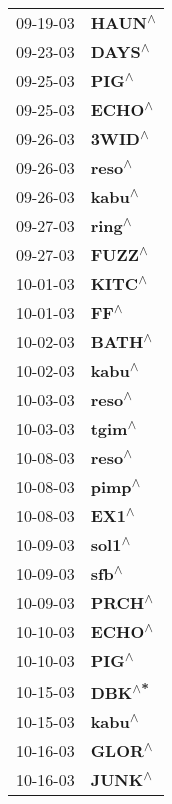 \begin{supertabular}{p{0.08\textwidth}p{0.2\textwidth}}
 09-19-03 &    \textbf{HAUN\textsuperscript{$\wedge$}} \\
 09-23-03 &    \textbf{DAYS\textsuperscript{$\wedge$}} \\
 09-25-03 &     \textbf{PIG\textsuperscript{$\wedge$}} \\
 09-25-03 &    \textbf{ECHO\textsuperscript{$\wedge$}} \\
 09-26-03 &    \textbf{3WID\textsuperscript{$\wedge$}} \\
 09-26-03 &    \textbf{reso\textsuperscript{$\wedge$}} \\
 09-26-03 &    \textbf{kabu\textsuperscript{$\wedge$}} \\
 09-27-03 &    \textbf{ring\textsuperscript{$\wedge$}} \\
 09-27-03 &    \textbf{FUZZ\textsuperscript{$\wedge$}} \\
 10-01-03 &    \textbf{KITC\textsuperscript{$\wedge$}} \\
 10-01-03 &      \textbf{FF\textsuperscript{$\wedge$}} \\
 10-02-03 &    \textbf{BATH\textsuperscript{$\wedge$}} \\
 10-02-03 &    \textbf{kabu\textsuperscript{$\wedge$}} \\
 10-03-03 &    \textbf{reso\textsuperscript{$\wedge$}} \\
 10-03-03 &    \textbf{tgim\textsuperscript{$\wedge$}} \\
 10-08-03 &    \textbf{reso\textsuperscript{$\wedge$}} \\
 10-08-03 &    \textbf{pimp\textsuperscript{$\wedge$}} \\
 10-08-03 &     \textbf{EX1\textsuperscript{$\wedge$}} \\
 10-09-03 &    \textbf{sol1\textsuperscript{$\wedge$}} \\
 10-09-03 &     \textbf{sfb\textsuperscript{$\wedge$}} \\
 10-09-03 &    \textbf{PRCH\textsuperscript{$\wedge$}} \\
 10-10-03 &    \textbf{ECHO\textsuperscript{$\wedge$}} \\
 10-10-03 &     \textbf{PIG\textsuperscript{$\wedge$}} \\
 10-15-03 &    \textbf{DBK\textsuperscript{$\wedge$*}} \\
 10-15-03 &    \textbf{kabu\textsuperscript{$\wedge$}} \\
 10-16-03 &    \textbf{GLOR\textsuperscript{$\wedge$}} \\
 10-16-03 &    \textbf{JUNK\textsuperscript{$\wedge$}} \\

\end{supertabular}

